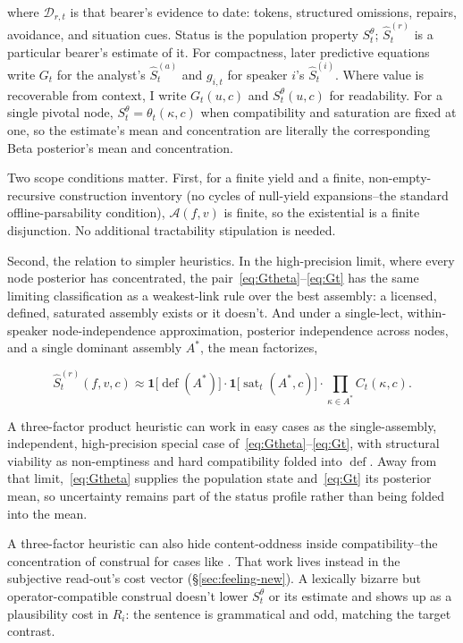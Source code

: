 \noindent where $\mathcal{D}_{r,t}$ is that bearer's evidence to date: tokens,
structured omissions, repairs, avoidance, and situation cues. Status is the
population property $S_t^{\theta}$; $\widehat{S}^{(r)}_t$ is a particular
bearer's estimate of it. For compactness, later predictive equations write
$G_t$ for the analyst's $\widehat{S}^{(a)}_t$ and $g_{i,t}$ for speaker $i$'s
$\widehat{S}^{(i)}_t$. Where
value is recoverable from context, I write $G_t(u,c)$ and $S_t^{\theta}(u,c)$
for readability. For a single pivotal node,
$S_t^{\theta}=\theta_t(\kappa,c)$ when compatibility and saturation are fixed at
one, so the estimate's mean and concentration are literally the corresponding
Beta posterior's mean and concentration.

Two scope conditions matter. First, for a finite yield and a finite,
non-empty-recursive construction inventory (no cycles of null-yield
expansions--the standard offline-parsability condition), $\mathcal{A}(f,v)$ is
finite, so the existential is a finite disjunction. No additional tractability
stipulation is needed.

Second, the relation to simpler heuristics. In the high-precision limit, where
every node posterior has concentrated, the pair~\eqref{eq:Gtheta}--\eqref{eq:Gt}
has the same limiting
classification as a weakest-link rule over the best assembly: a licensed,
defined, saturated assembly exists or it doesn't. And under a single-lect,
within-speaker node-independence approximation, posterior independence across
nodes, and a single dominant assembly $A^{\ast}$, the mean factorizes,

\begin{equation}
\widehat{S}^{(r)}_t(f,v,c)\approx \mathbf{1}\bigl[\operatorname{def}(A^{\ast})\bigr]
\cdot \mathbf{1}\bigl[\operatorname{sat}_t(A^{\ast},c)\bigr]
\cdot \prod_{\kappa\in A^{\ast}} C_t(\kappa,c).
\end{equation}

\noindent A three-factor product heuristic can work in easy cases as the
single-assembly, independent, high-precision special case
of~\eqref{eq:Gtheta}--\eqref{eq:Gt}, with structural viability as non-emptiness and
hard compatibility folded into $\operatorname{def}$. Away from that
limit,~\eqref{eq:Gtheta} supplies the population state and~\eqref{eq:Gt} its posterior
mean, so uncertainty remains part of the status profile rather than being folded
into the mean.

A three-factor heuristic can also hide content-oddness inside compatibility--the
concentration of construal for cases like . That
work lives instead in the subjective read-out's cost vector
(\S\ref{sec:feeling-new}). A lexically bizarre but operator-compatible construal
doesn't lower $S_t^{\theta}$ or its estimate and shows up as a plausibility
cost in $R_i$: the sentence is grammatical and odd, matching the target
contrast.

